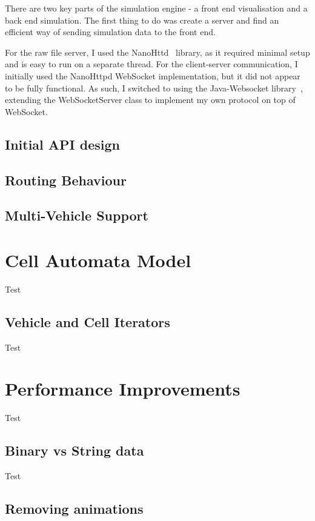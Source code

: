 \documentclass[ draft,
                    author={Alexander Hill},
                supervisor={Dr. Benjamin Sach},
                    degree={MEng},
                     title={MARMOSET: Multi Agent Real-time Multi-core Online
                     Simulation for Efficient Transportation},
                  subtitle={},
                      type={research},
                      year={2016} ]{dissertation}
\begin{document}
There are two key parts of the simulation engine - a front end visualisation and
a back end simulation. The first thing to do was create a server and find an
efficient way of sending simulation data to the front end.

For the raw file server, I used the NanoHttd~\cite{nanohttpd} library, as it
required minimal setup and is easy to run on a separate thread. For the
client-server communication, I initially used the NanoHttpd WebSocket
implementation, but it did not appear to be fully functional. As such, I
switched to using the Java-Websocket library~\cite{javawebsocket}, extending the
WebSocketServer class to implement my own protocol on top of WebSocket.

\subsection{Initial API design}

\subsection{Routing Behaviour}

\subsection{Multi-Vehicle Support}

\section{Cell Automata Model}

Test

\subsection{Vehicle and Cell Iterators}

Test

\section{Performance Improvements}

Test

\subsection{Binary vs String data}

Test

\subsection{Removing animations}
\end{document}
